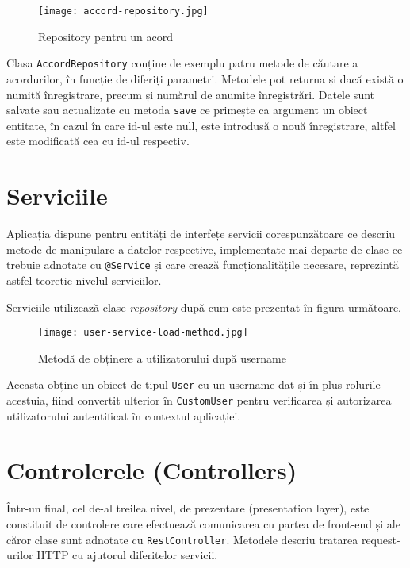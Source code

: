 \begin{figure}[H]
	\centering
	\texttt{[image: accord-repository.jpg]}
	\caption{Repository pentru un acord}
\end{figure}

Clasa \texttt{AccordRepository} conține de exemplu patru metode de căutare a acordurilor, în funcție de diferiți parametri. Metodele pot returna și dacă există o numită înregistrare, precum și numărul de anumite înregistrări. Datele sunt salvate sau actualizate cu metoda \texttt{save} ce primește ca argument un obiect entitate, în cazul în care id-ul este null, este introdusă o nouă înregistrare, altfel este modificată cea cu id-ul respectiv.

\section{Serviciile}

Aplicația dispune pentru entități de interfețe servicii corespunzătoare ce descriu metode de manipulare a datelor respective, implementate mai departe de clase ce trebuie adnotate cu \texttt{@Service} și care crează funcționalitățile necesare, reprezintă astfel teoretic nivelul serviciilor.

Serviciile utilizează clase \textit{repository} după cum este prezentat în figura următoare.

\begin{figure}[H]
	\centering
	\texttt{[image: user-service-load-method.jpg]}
	\caption{Metodă de obținere a utilizatorului după username}
\end{figure}

Aceasta obține un obiect de tipul \texttt{User} cu un username dat și în plus rolurile acestuia, fiind convertit ulterior în \texttt{CustomUser} pentru verificarea și autorizarea utilizatorului autentificat în contextul aplicației.

\section{Controlerele (Controllers)}

Într-un final, cel de-al treilea nivel, de prezentare (presentation layer), este constituit de controlere care efectuează comunicarea cu partea de front-end și ale căror clase sunt adnotate cu \texttt{RestController}. Metodele descriu tratarea request-urilor HTTP cu ajutorul diferitelor servicii.

